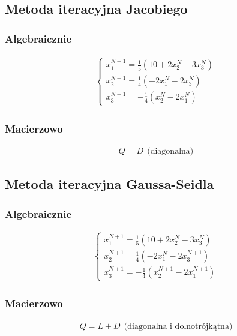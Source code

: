 \documentclass[12pt]{article}
\begin{document}
    \subsection{Metoda iteracyjna Jacobiego}

    \subsubsection{Algebraicznie}
    \begin{align*}
        \left\{\begin{matrix}
                   x^{N+1}_1 = \frac{1}{5}(10 + 2x^N_2 - 3x^N_3)\\
                   x^{N+1}_2 = \frac{1}{4}(-2x^N_1 - 2x^N_3)\\
                   x^{N+1}_3 = -\frac{1}{4}(x^N_2 - 2x^N_1)
        \end{matrix}\right.
    \end{align*}

    \subsubsection{Macierzowo}
    \begin{align*}
        Q = D ~~ \text{(diagonalna)}
    \end{align*}

    \subsection{Metoda iteracyjna Gaussa-Seidla}
    \subsubsection{Algebraicznie}
    \begin{align*}
        \left\{\begin{matrix}
                   x^{N+1}_1 = \frac{1}{5}(10 + 2x^N_2 - 3x^N_3)\\
                   x^{N+1}_2 = \frac{1}{4}(-2x^N_1 - 2x^{N+1}_3)\\
                   x^{N+1}_3 = -\frac{1}{4}(x^{N+1}_2 - 2x^{N+1}_1)
        \end{matrix}\right.
    \end{align*}

    \subsubsection{Macierzowo}
    \begin{align*}
        Q = L + D ~~ \text{(diagonalna i dolnotrójkątna)}
    \end{align*}
\end{document}
